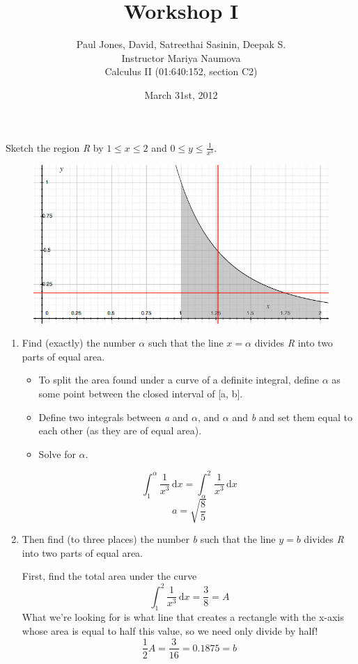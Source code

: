 \documentclass[11pt]{article}
\title{Workshop I}
\author{Paul Jones, David, Satreethai Sasinin, Deepak S.\\
		Instructor Mariya Naumova\\
		Calculus II (01:640:152, section C2)}
\date{March 31st, 2012}
\begin{document}
\maketitle

\pagebreak

Sketch the region \emph{R} by $1 \le x \le 2$ and $0 \le y \le \frac{1}{x^3}$.

\begin{figure}[h]
     \centering
          \label{fig.png}
          \includegraphics*[height=.3\linewidth]{fig}
\end{figure}

\begin {enumerate}

	\item Find (exactly) the number $\alpha$ such that the line $x = \alpha$ divides \emph{R} into two parts of equal area.
	\begin{itemize}
		\item To split the area found under a curve of a definite integral, define $\alpha$ as some point between the closed interval of [a, b].
		\item Define two integrals between \emph{a} and $\alpha$, and  $\alpha$ and \emph{b} and set them equal to each other (as they are of equal area).
		\item Solve for $\alpha$.
	\end{itemize}
	\begin{equation*}
	\int_1^\alpha \! \frac{1}{x^3} \, \mathrm{d} x = \int_\alpha^2 \! \frac{1}{x^3} \, \mathrm{d} x
	\end{equation*}
	\begin{equation*}
	a = \sqrt{\frac{8}{5}}
	\end{equation*}
	
	\item Then find (to three places) the number \emph{b} such that the line $y = b$ divides \emph{R} into two parts of equal area.
	
	First, find the total area under the curve
	\begin{equation*}
	\int_1^2 \! \frac{1}{x^3} \,\mathrm{d} x = \frac{3}{8} = A
	\end{equation*}
	What we're looking for is what line that creates a rectangle with the x-axis whose area is equal to half this value, so we need only divide by half!
	\begin{equation*}
	\frac{1}{2} A = \frac{3}{16} = 0.1875 = b
	\end{equation*}

\end{enumerate}
\end{document}
